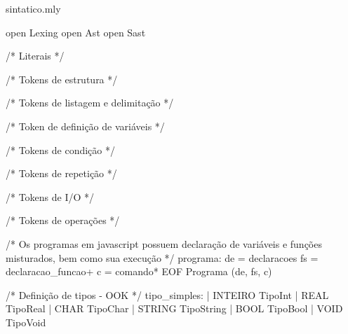 \documentclass[12pt,a4paper,twoside]{article}
\begin{document}
sintatico.mly
\begin{terminal}

open Lexing
open Ast
open Sast

/* Literais */


/* Tokens de estrutura */


/* Tokens de listagem e delimitação */

/* Token de definição de variáveis */

/* Tokens de condição */

/* Tokens de repetição */

/* Tokens de I/O */

/* Tokens de operações */





/* Os programas em javascript possuem declaração de variáveis e funções misturados, bem como sua execução */
programa:	de = declaracoes
			fs = declaracao_funcao+
			c = comando*
			EOF { Programa (de, fs, c) }	


/* Definição de tipos      					- OOK */
tipo_simples:
				| INTEIRO 		{ TipoInt 		}
				| REAL		  	{ TipoReal 		}
        		| CHAR      	{ TipoChar    	}
				| STRING    	{ TipoString 	}
				| BOOL 			{ TipoBool 		}
				| VOID			{ TipoVoid 		}


\end{terminal}
\end{document}
